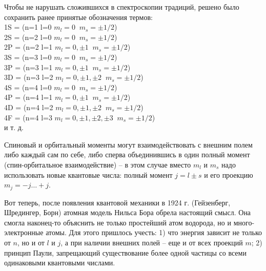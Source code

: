 \documentclass[12pt,epsfig,color,russian]{article}
\begin{document}
Чтобы не нарушать сложившихся в спектроскопии традиций, решено было сохранить ранее принятые обозначения термов:\\
1S = (n=1 l=0 $m_l=0 \;\;m_s=\pm1/2$)\\
2S = (n=2 l=0 $m_l=0 \;\;m_s=\pm1/2$)\\
2P = (n=2 l=1 $m_l=0,\pm1 \;\;m_s=\pm1/2$)\\
3S = (n=3 l=0 $m_l=0 \;\;m_s=\pm1/2$)\\
3P = (n=3 l=1 $m_l=0,\pm1 \;\;m_s=\pm1/2$)\\
3D = (n=3 l=2 $m_l=0,\pm1,\pm2 \;\;m_s=\pm1/2$)\\
4S = (n=4 l=0 $m_l=0 \;\;m_s=\pm1/2$)\\
4P = (n=4 l=1 $m_l=0,\pm1 \;\;m_s=\pm1/2$)\\
4D = (n=4 l=2 $m_l=0,\pm1,\pm2 \;\;m_s=\pm1/2$)\\
4F = (n=4 l=3 $m_l=0,\pm1,\pm2,\pm3 \;\;m_s=\pm1/2$)\\
и т. д.

Спиновый и орбитальный моменты могут взаимодействовать с внешним полем либо каждый сам по себе, либо сперва объединившись в один полный момент (спин-орбитальное взаимодействие) -- в этом случае вместо $m_l$ и $m_s$ надо использовать новые квантовые числа: полный момент $j=l\pm s$ и его проекцию $m_j=-j\ldots+j$.

Вот теперь, после появления квантовой механики в 1924 г. (Гейзенберг, Шредингер, Борн) атомная модель Нильса Бора обрела настоящий смысл. Она смогла наконец-то объяснить не только простейший атом водорода, но и много-электронные атомы. Для этого пришлось учесть: 1) что энергия зависит не только от $n$, но и от $l$ и $j$, а при наличии внешних полей -- еще и от всех проекций $m$; 2) принцип Паули, запрещающий существование более одной частицы со всеми одинаковыми квантовыми числами.
\end{document}
